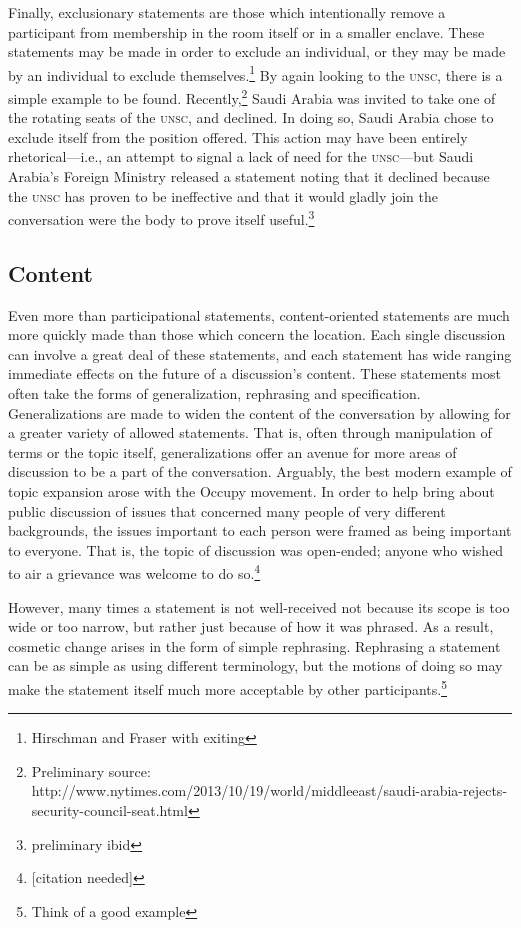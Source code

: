 \documentclass{article}
\begin{document}
Finally, exclusionary statements are those which intentionally remove a participant from membership in the room itself or in a smaller enclave.
These statements may be made in order to exclude an individual, or they may be made by an individual to exclude themselves.\footnote{Hirschman and Fraser with exiting}
By again looking to the \textsc{unsc}, there is a simple example to be found.
Recently,\footnote{Preliminary source: http://www.nytimes.com/2013/10/19/world/middleeast/saudi-arabia-rejects-security-council-seat.html} Saudi Arabia was invited to take one of the rotating seats of the \textsc{unsc}, and declined.
In doing so, Saudi Arabia chose to exclude itself from the position offered.
This action may have been entirely rhetorical---i.e., an attempt to signal a lack of need for the \textsc{unsc}---but Saudi Arabia's Foreign Ministry released a statement noting that it declined because the \textsc{unsc} has proven to be ineffective and that it would gladly join the conversation were the body to prove itself useful.\footnote{preliminary ibid}

\subsection{Content}
Even more than participational statements, content-oriented statements are much more quickly made than those which concern the location.
Each single discussion can involve a great deal of these statements, and each statement has wide ranging immediate effects on the future of a discussion's content.
These statements most often take the forms of generalization, rephrasing and specification.
Generalizations are made to widen the content of the conversation by allowing for a greater variety of allowed statements.
That is, often through manipulation of terms or the topic itself, generalizations offer an avenue for more areas of discussion to be a part of the conversation.
Arguably, the best modern example of topic expansion arose with the Occupy movement.
In order to help bring about public discussion of issues that concerned many people of very different backgrounds, the issues important to each person were framed as being important to everyone.
That is, the topic of discussion was open-ended; anyone who wished to air a grievance was welcome to do so.\footnote{[citation needed]}

However, many times a statement is not well-received not because its scope is too wide or too narrow, but rather just because of how it was phrased.
As a result, cosmetic change arises in the form of simple rephrasing.
Rephrasing a statement can be as simple as using different terminology, but the motions of doing so may make the statement itself much more acceptable by other participants.\footnote{Think of a good example}
\end{document}
